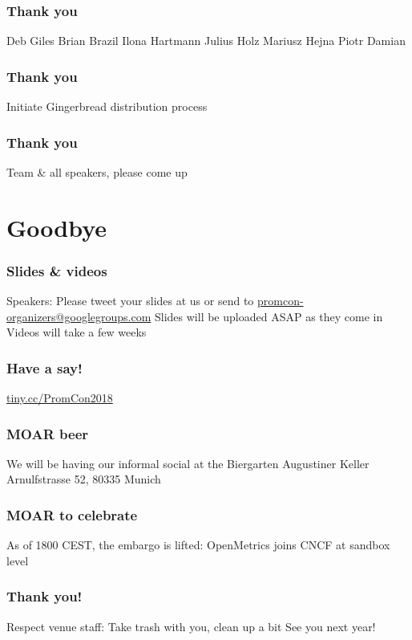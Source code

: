 \documentclass[t]{beamer}
\begin{document}
\begin{frame}
	\frametitle{Thank you}
	\begin{center}
	\vfill
	Deb Giles
	\vfill
	Brian Brazil
	\vfill
	Ilona Hartmann
	\vfill
	Julius Holz
	\vfill
	Mariusz Hejna
	\vfill
	Piotr Damian
	\vfill
	\end{center}
\end{frame}

\begin{frame}
	\frametitle{Thank you}
	\begin{center}
	\vfill
	Initiate Gingerbread distribution process
	\vfill
	\end{center}
\end{frame}

\begin{frame}
	\frametitle{Thank you}
	\begin{center}
	\vfill
	Team \& all speakers, please come up
	\vfill
	\end{center}
\end{frame}

\section{Goodbye}

\begin{frame}
	\frametitle{Slides \& videos}
	\begin{center}
		\vfill
		Speakers: Please tweet your slides at us or send to \url{promcon-organizers@googlegroups.com}
		\vfill
		Slides will be uploaded ASAP as they come in
		\vfill
		Videos will take a few weeks
		\vfill
	\end{center}
\end{frame}
\begin{frame}
	\frametitle{Have a say!}
	\begin{center}
	\vfill
	\url{tiny.cc/PromCon2018}
	\vfill
	\end{center}
\end{frame}

\begin{frame}
	\frametitle{MOAR beer}
	\begin{center}
	\vfill
	We will be having our informal social at the Biergarten
	\vfill
	Augustiner Keller
	\vfill
	Arnulfstrasse 52, 80335 Munich
	\vfill
	\end{center}
\end{frame}

\begin{frame}
	\frametitle{MOAR to celebrate}
	\begin{center}
	\vfill
	As of 1800 CEST, the embargo is lifted:
	\vfill
	OpenMetrics joins CNCF at sandbox level
	\vfill
	\end{center}
\end{frame}

\begin{frame}
	\frametitle{Thank you!}
	\begin{center}
	\vfill
	Respect venue staff: Take trash with you, clean up a bit
	\vfill
	See you next year!
	\vfill
	\end{center}
\end{frame}
\end{document}
